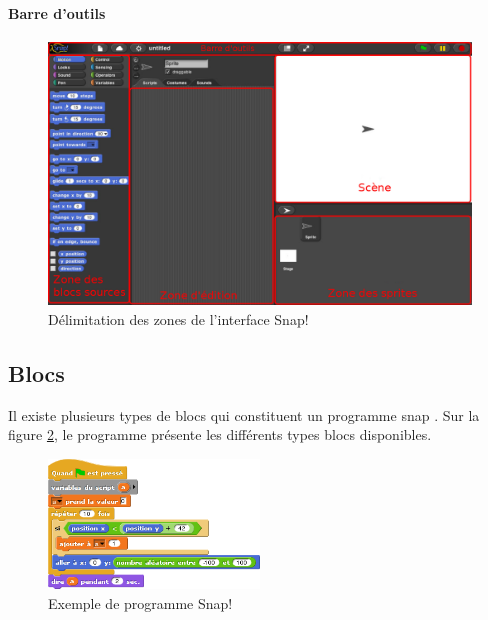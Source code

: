 \paragraph{Barre d'outils}

\begin{figure}
  \begin{center}
  \includegraphics[width=\textwidth]{content/7-solution/2-snap/images/interface}
        \caption{Délimitation des zones de l'interface Snap!}
    \label{fig:snap interface}
  \end{center}
\end{figure}

\subsection{Blocs}
Il existe plusieurs types de \glspl{bloc} qui constituent un programme \gls{snap} \cite{snap-man}. Sur la figure \ref{fig:software-used-script}, le programme présente les différents types \glspl{bloc} disponibles.
\begin{figure}
  \begin{center}
    \includegraphics[width=0.5\textwidth]{content/5-related_work/images/script}
    \caption{Exemple de programme Snap!}
    \label{fig:software-used-script}
  \end{center}
\end{figure}


